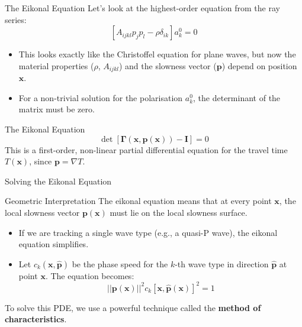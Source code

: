 \documentclass{beamer}
\begin{document}

\begin{frame}{The Eikonal Equation}
    Let's look at the highest-order equation from the ray series:
    $$ [A_{ijkl}p_{j}p_{l}-\rho\delta_{ik}]a_{k}^{0}=0 $$
    \pause
    \begin{itemize}
        \item This looks exactly like the Christoffel equation for plane waves, but now the material properties ($\rho$, $A_{ijkl}$) and the slowness vector ($\mathbf{p}$) depend on position $\mathbf{x}$.
        \pause
        \item For a non-trivial solution for the polarisation $a_k^0$, the determinant of the matrix must be zero.
    \end{itemize}
    \pause
    \begin{alertblock}{The Eikonal Equation}
        $$ \det[\mathbf{\Gamma}(\mathbf{x}, \mathbf{p}(\mathbf{x}))-\mathbf{I}]=0 $$
        This is a first-order, non-linear partial differential equation for the travel time $T(\mathbf{x})$, since $\mathbf{p} = \nabla T$.
    \end{alertblock}
\end{frame}

\begin{frame}{Solving the Eikonal Equation}
    \begin{exampleblock}{Geometric Interpretation}
        The eikonal equation means that at every point $\mathbf{x}$, the local slowness vector $\mathbf{p}(\mathbf{x})$ must lie on the local slowness surface.
    \end{exampleblock}
    \pause
    \begin{itemize}
        \item If we are tracking a single wave type (e.g., a quasi-P wave), the eikonal equation simplifies.
        \pause
        \item Let $c_k(\mathbf{x}, \hat{\mathbf{p}})$ be the phase speed for the $k$-th wave type in direction $\hat{\mathbf{p}}$ at point $\mathbf{x}$. The equation becomes:
        $$ ||\mathbf{p}(\mathbf{x})||^2 c_k[\mathbf{x}, \hat{\mathbf{p}}(\mathbf{x})]^2 = 1 $$
    \end{itemize}
    \pause
    To solve this PDE, we use a powerful technique called the \textbf{method of characteristics}.
\end{frame}

\end{document}
